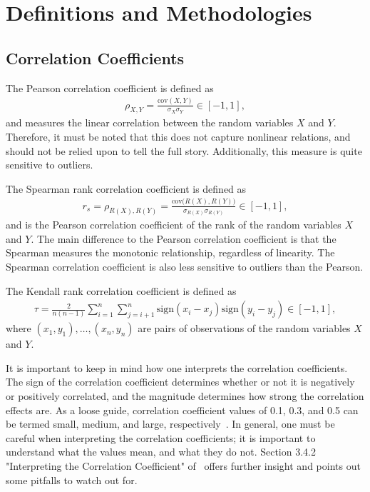 \chapter{Definitions and Methodologies}
\section{Correlation Coefficients}\label{app:correlation_coefficients}
The Pearson correlation coefficient is defined as
\begin{align}
    \rho_{X,Y} = \frac{\text{cov}{(X,Y)}}{\sigma_X \sigma_Y} \in [-1, 1],
\end{align}
and measures the linear correlation between the random variables \( X \) and \( Y \).
Therefore, it must be noted that this does not capture nonlinear relations, and should not be relied upon to tell the full story.
Additionally, this measure is quite sensitive to outliers.

The Spearman rank correlation coefficient is defined as
\begin{align}
    r_s = \rho_{R(X),R(Y)} = \frac{\text{cov}{\big(R(X),R(Y)\big)}}{\sigma_{R(X)} \sigma_{R(Y)}} \in [-1, 1],
\end{align}
and is the Pearson correlation coefficient of the rank of the random variables \( X \) and \( Y \).
The main difference to the Pearson correlation coefficient is that the Spearman measures the monotonic relationship, regardless of linearity.
The Spearman correlation coefficient is also less sensitive to outliers than the Pearson.

The Kendall rank correlation coefficient is defined as
\begin{align}
    \tau = \frac{2}{n(n-1)} \sum_{i=1}^{n}\sum_{j=i+1}^{n} \text{sign}(x_i - x_j) \text{sign}(y_i - y_j) \in [-1, 1],
\end{align}
where \( (x_1, y_1), \dots, (x_n, y_n) \) are pairs of observations of the random variables \( X \) and \( Y \).

It is important to keep in mind how one interprets the correlation coefficients.
The sign of the correlation coefficient determines whether or not it is negatively or positively correlated, and the magnitude determines how strong the correlation effects are.
As a loose guide, correlation coefficient values of 0.1, 0.3, and 0.5 can be termed small, medium, and large, respectively~\cite{research_design_and_statistical_analysis}.
In general, one must be careful when interpreting the correlation coefficients; it is important to understand what the values mean, and what they do not.
Section 3.4.2 "Interpreting the Correlation Coefficient" of~\cite{research_design_and_statistical_analysis} offers further insight and points out some pitfalls to watch out for.

